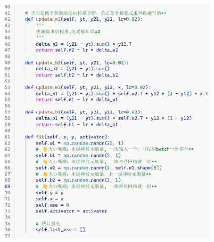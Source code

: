 \documentclass[a5paper, 11pt]{ctexbook}
\begin{document}
\begin{figure}[h!]
    \centering
    \includegraphics[width=\textwidth, frame]{figures/BP2.png}
\end{figure}

\newpage
\end{document}
